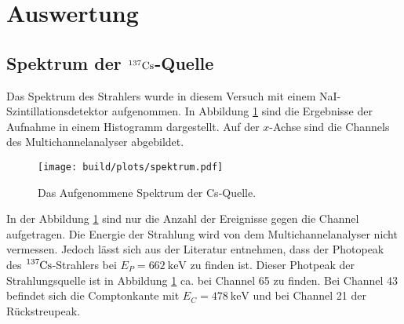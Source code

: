 \newpage 
\section{Auswertung}

  \subsection{Spektrum der $^{137}\text{Cs}$-Quelle}
    Das Spektrum des Strahlers wurde in diesem Versuch mit einem NaI-Szintillationsdetektor aufgenommen. 
    In Abbildung \ref{fig:Spektrum} sind die Ergebnisse der Aufnahme in einem Histogramm dargestellt. Auf der $x$-Achse sind die Channels des Multichannelanalyser abgebildet.
    \begin{figure}[H]
      \centering  
      \texttt{[image: build/plots/spektrum.pdf]}
      \caption{Das Aufgenommene Spektrum der Cs-Quelle.}
      \label{fig:Spektrum}
    \end{figure}

    \noindent In der Abbildung \ref{fig:Spektrum} sind nur die Anzahl der Ereignisse gegen die Channel aufgetragen. 
    Die Energie der Strahlung wird von dem Multichannelanalyser nicht vermessen. 
    Jedoch lässt sich aus der Literatur \cite{leifi} entnehmen, dass der Photopeak des $\ce{^{137}Cs}$-Strahlers bei $E_P = \SI{662}{\kilo\electronvolt}$ zu finden ist.
    Dieser Photpeak der Strahlungsquelle ist in Abbildung \ref{fig:Spektrum} ca. bei Channel 65 zu finden. 
    Bei Channel 43 befindet sich die Comptonkante mit $E_C = \SI{478}{\kilo\electronvolt}$ und bei Channel 21 der Rückstreupeak.


